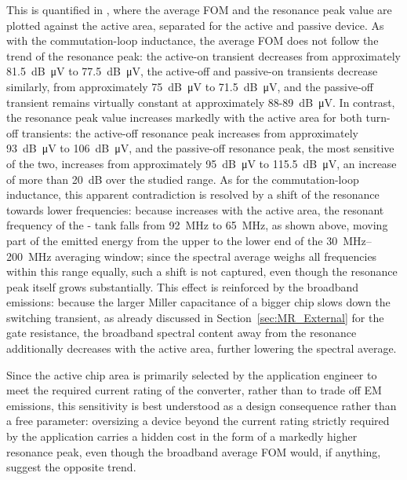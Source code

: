 This is quantified in , where the average FOM and the resonance peak value are plotted against the active area, separated for the active and passive device.
As with the commutation-loop inductance, the average FOM does not follow the trend of the resonance peak: the active-on transient decreases from approximately \SI{81.5}{dB\micro V} to \SI{77.5}{dB\micro V}, the active-off and passive-on transients decrease similarly, from approximately \SI{75}{dB\micro V} to \SI{71.5}{dB\micro V}, and the passive-off transient remains virtually constant at approximately \SI{88}{}-\SI{89}{dB\micro V}.
In contrast, the resonance peak value increases markedly with the active area for both turn-off transients: the active-off resonance peak increases from approximately \SI{93}{dB\micro V} to \SI{106}{dB\micro V}, and the passive-off resonance peak, the most sensitive of the two, increases from approximately \SI{95}{dB\micro V} to \SI{115.5}{dB\micro V}, an increase of more than \SI{20}{dB} over the studied range.
As for the commutation-loop inductance, this apparent contradiction is resolved by a shift of the resonance towards lower frequencies: because  increases with the active area, the resonant frequency of the - tank falls from \SI{92}{MHz} to \SI{65}{MHz}, as shown above, moving part of the emitted energy from the upper to the lower end of the \SIrange{30}{200}{MHz} averaging window; since the spectral average weighs all frequencies within this range equally, such a shift is not captured, even though the resonance peak itself grows substantially.
This effect is reinforced by the broadband emissions: because the larger Miller capacitance of a bigger chip slows down the switching transient, as already discussed in Section~\ref{sec:MR_External} for the gate resistance, the broadband spectral content away from the resonance additionally decreases with the active area, further lowering the spectral average.

Since the active chip area is primarily selected by the application engineer to meet the required current rating of the converter, rather than to trade off EM emissions, this sensitivity is best understood as a design consequence rather than a free parameter: oversizing a device beyond the current rating strictly required by the application carries a hidden cost in the form of a markedly higher resonance peak, even though the broadband average FOM would, if anything, suggest the opposite trend.

\FloatBarrier

